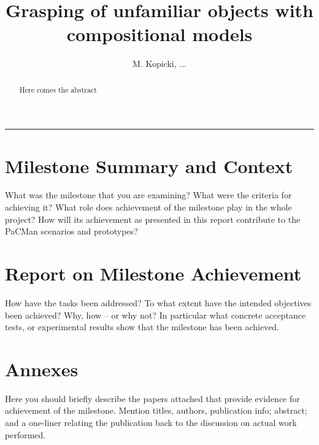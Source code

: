 \documentclass[a4paper,11pt,pdf]{pacmanreport}
\title{Grasping of unfamiliar objects with compositional models}
\author{M. Kopicki, ...}
\begin{document}
\maketitle

\begin{abstract}
\noindent Here comes the abstract
\end{abstract}


\vspace{.2em}
\hrule

\vspace{.2em}
\footnotesize

\tableofcontents

\normalsize

\newpage

\section{Milestone Summary and Context}

What was the milestone that you are examining? What were the criteria for achieving it? What role does achievement of the milestone play in the whole project\cite{ProjectWebsite}? How will its achievement as presented in this report contribute to the PaCMan scenarios and prototypes? 


\newpage

\section{Report on Milestone Achievement}

How have the tasks been addressed? To what extent have the intended objectives been achieved? Why, how -- or why not? In particular what concrete acceptance tests, or experimental results show that the milestone has been achieved.

\newpage



\newpage
\appendix
\section{Annexes}

Here you should briefly describe the papers attached that provide evidence for achievement of the milestone. Mention titles, authors, publication info; abstract; and a one-liner relating the publication back to the discussion on actual work performed. 
\end{document}

